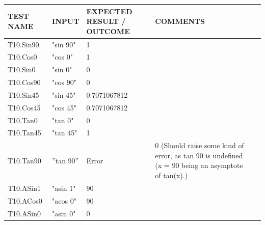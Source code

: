 \documentclass[a4paper, oneside, 11pt]{report}
\begin{document}
    \begin{tabular}{|p{1.5in}|p{1.5in}|p{1.6in}|p{1.6in}|p{2.4in}|}
        \hline
        TEST NAME       & INPUT                     & EXPECTED RESULT / OUTCOME              & COMMENTS                                \\
        \hline
        T10.Sin90        & "sin 90"                   & 1                                      &                                         \\
        \hline
        T10.Cos0         & "cos 0"                   & 1                                      &                                         \\
        \hline
        T10.Sin0         & "sin 0"                    & 0                                      &                                         \\
        \hline
        T10.Cos90        & "cos 90"                  & 0                                      &                                         \\
        \hline
        T10.Sin45        & "sin 45"                   & 0.7071067812                           &                                         \\
        \hline
        T10.Cos45        & "cos 45"                  & 0.7071067812                           &                                         \\
        \hline
        T10.Tan0         & "tan 0"                   & 0                                      &                                         \\
        \hline
        T10.Tan45        & "tan 45"                  & 1                                      &                                         \\
        \hline
        T10.Tan90        & ”tan 90”                  & Error                                  & 0 (Should raise some kind of error, as tan 90 is undefined (x = 90 being an asymptote of tan(x).) \\
        \hline
        T10.ASin1        & "asin 1"                   & 90                                     &                                         \\
        \hline
        T10.ACos0        & "acos 0"                   & 90                                     &                                         \\
        \hline
        T10.ASin0        & "asin 0"                   & 0                                      &                                         \\

\end{tabular}
\end{document}

